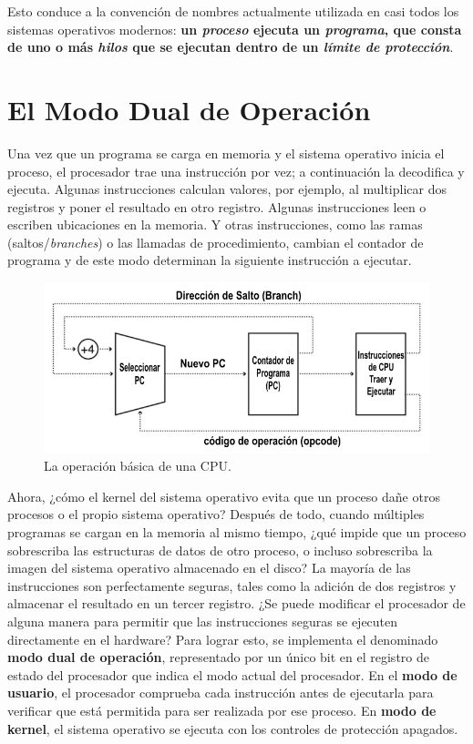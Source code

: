 \documentclass[10pt]{book}
\begin{document}
Esto conduce a la convención de nombres actualmente utilizada en casi todos los sistemas operativos modernos: \textbf{un \textit{proceso} ejecuta un \textit{programa}, que consta de uno o más \textit{hilos} que se ejecutan dentro de un \textit{límite de protección}}.


\section{El Modo Dual de Operación}
Una vez que un programa se carga en memoria y el sistema operativo inicia el proceso, el procesador trae una instrucción por vez; a continuación la decodifica y ejecuta. Algunas instrucciones calculan valores, por ejemplo, al multiplicar dos registros y poner el resultado en otro registro. Algunas instrucciones leen o escriben ubicaciones en la memoria. Y otras instrucciones, como las ramas (saltos/\textit{branches}) o las llamadas de procedimiento, cambian el contador de programa y de este modo determinan la siguiente instrucción a ejecutar.

\begin{figure}[tbhp]
\centerline{\includegraphics[scale=0.70]{img/fig0201}}
\caption{La operación básica de una CPU.}
\label{fig0201}
\end{figure}

Ahora, ¿cómo el kernel del sistema operativo evita que un proceso dañe otros procesos o el propio sistema operativo? Después de todo, cuando múltiples programas se cargan en la memoria al mismo tiempo, ¿qué impide que un proceso sobrescriba las estructuras de datos de otro proceso, o incluso sobrescriba la imagen del sistema operativo almacenado en el disco? La mayoría de las instrucciones son perfectamente seguras, tales como la adición de dos registros y almacenar el resultado en un tercer registro. ¿Se puede modificar el procesador de alguna manera para permitir que las instrucciones seguras se ejecuten directamente en el hardware? Para lograr esto, se implementa el denominado \textbf{modo dual de operación}, representado por un único bit en el registro de estado del procesador que indica el modo actual del procesador. En el \textbf{modo de usuario}, el procesador comprueba cada instrucción antes de ejecutarla para verificar que está permitida para ser realizada por ese proceso. En \textbf{modo de kernel}, el sistema operativo se ejecuta con los controles de protección apagados.
\end{document}
